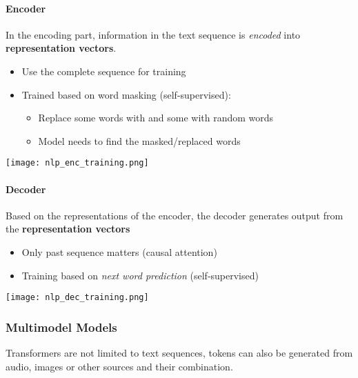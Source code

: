 \paragraph{Encoder}
In the encoding part, information in the text sequence is \textit{encoded} into \textbf{representation vectors}.
\newpar{}
\begin{itemize}
    \item Use the complete sequence for training
    \item Trained based on word masking (self-supervised):
    \begin{itemize}
        \item Replace some words with  and some with random words
        \item Model needs to find the masked/replaced words
    \end{itemize}
\end{itemize}
\begin{center}
    \texttt{[image: nlp\_enc\_training.png]}
\end{center}


\paragraph{Decoder}

Based on the representations of the encoder, the decoder generates output from the \textbf{representation vectors}
\newpar{}
\begin{itemize}
    \item Only past sequence matters (causal attention)
    \item Training based on \textit{next word prediction} (self-supervised)
\end{itemize}
\begin{center}
    \texttt{[image: nlp\_dec\_training.png]}
\end{center}

\subsubsection{Multimodel Models}
Transformers are not limited to text sequences, tokens can also be generated from audio, images or other sources and their combination.


